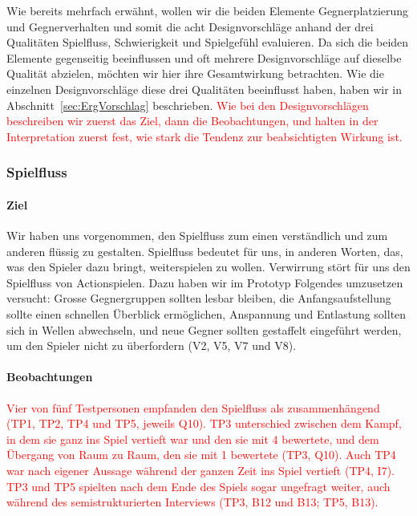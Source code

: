\documentclass[../Main.tex]{subfiles}
\begin{document}
Wie bereits mehrfach erwähnt, wollen wir die beiden Elemente Gegnerplatzierung und Gegnerverhalten und somit die acht Designvorschläge anhand der drei Qualitäten Spielfluss, Schwierigkeit und Spielgefühl evaluieren. Da sich die beiden Elemente gegenseitig beeinflussen und oft mehrere Designvorschläge auf dieselbe Qualität abzielen, möchten wir hier ihre Gesamtwirkung betrachten. Wie die einzelnen Designvorschläge diese drei Qualitäten beeinflusst haben, haben wir in Abschnitt~\ref{sec:ErgVorschlag} beschrieben. \textcolor{red}{Wie bei den Designvorschlägen beschreiben wir zuerst das Ziel, dann die Beobachtungen, und halten in der Interpretation zuerst fest, wie stark die Tendenz zur beabsichtigten Wirkung ist.}

\subsubsection{Spielfluss}

\paragraph{Ziel}
Wir haben uns vorgenommen, den Spielfluss zum einen verständlich und zum anderen flüssig zu gestalten. Spielfluss bedeutet für uns, in anderen Worten, das, was den Spieler dazu bringt, weiterspielen zu wollen. Verwirrung stört für uns den Spielfluss von Actionspielen. Dazu haben wir im Prototyp Folgendes umzusetzen versucht: Grosse Gegnergruppen sollten lesbar bleiben, die Anfangsaufstellung sollte einen schnellen Überblick ermöglichen, Anspannung und Entlastung sollten sich in Wellen abwechseln, und neue Gegner sollten gestaffelt eingeführt werden, um den Spieler nicht zu überfordern (V2, V5, V7 und V8).

\paragraph{Beobachtungen}
\textcolor{red}{Vier von fünf Testpersonen empfanden den Spielfluss als zusammenhängend (TP1, TP2, TP4 und TP5, jeweils Q10). TP3 unterschied zwischen dem Kampf, in dem sie ganz ins Spiel vertieft war und den sie mit 4 bewertete, und dem Übergang von Raum zu Raum, den sie mit 1 bewertete (TP3, Q10). Auch TP4 war nach eigener Aussage während der ganzen Zeit ins Spiel vertieft (TP4, I7).} \textcolor{red}{TP3 und TP5 spielten nach dem Ende des Spiels sogar ungefragt weiter, auch während des semistrukturierten Interviews (TP3, B12 und B13; TP5, B13).}
\end{document}

